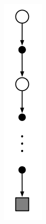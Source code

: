 \begin{minipage}[c]{0.1\textwidth}
    \includegraphics[height = 3\textwidth]{Figures/MC_diagram.png}
\end{minipage}

